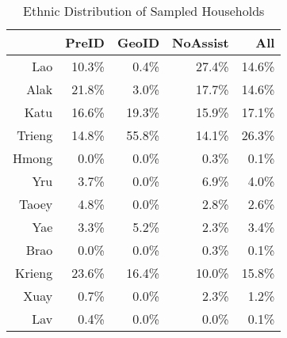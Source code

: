 \begin{table}[ht]
\centering
\begin{tabular}{rrrrr}
  \hline
 & PreID & GeoID & NoAssist & All \\ 
  \hline
Lao & 10.3\% & 0.4\% & 27.4\% & 14.6\% \\ 
  Alak & 21.8\% & 3.0\% & 17.7\% & 14.6\% \\ 
  Katu & 16.6\% & 19.3\% & 15.9\% & 17.1\% \\ 
  Trieng & 14.8\% & 55.8\% & 14.1\% & 26.3\% \\ 
  Hmong & 0.0\% & 0.0\% & 0.3\% & 0.1\% \\ 
  Yru & 3.7\% & 0.0\% & 6.9\% & 4.0\% \\ 
  Taoey & 4.8\% & 0.0\% & 2.8\% & 2.6\% \\ 
  Yae & 3.3\% & 5.2\% & 2.3\% & 3.4\% \\ 
  Brao & 0.0\% & 0.0\% & 0.3\% & 0.1\% \\ 
  Krieng & 23.6\% & 16.4\% & 10.0\% & 15.8\% \\ 
  Xuay & 0.7\% & 0.0\% & 2.3\% & 1.2\% \\ 
  Lav & 0.4\% & 0.0\% & 0.0\% & 0.1\% \\ 
   \hline
\end{tabular}
\caption{Ethnic Distribution of Sampled Households} 
\end{table}

